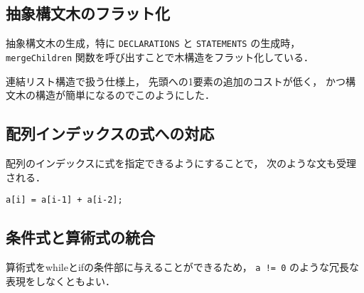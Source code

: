 \documentclass[lualatex, a4paper, ja=standard]{bxjsarticle}
\begin{document}
\subsection{抽象構文木のフラット化}

抽象構文木の生成，特に \verb|DECLARATIONS| と \verb|STATEMENTS| の生成時，
\verb|mergeChildren| 関数を呼び出すことで木構造をフラット化している．

連結リスト構造で扱う仕様上，
先頭への1要素の追加のコストが低く，
かつ構文木の構造が簡単になるのでこのようにした．

\subsection{配列インデックスの式への対応}

配列のインデックスに式を指定できるようにすることで，
次のような文も受理される．
\begin{Verbatim}[frame=lines]
a[i] = a[i-1] + a[i-2];
\end{Verbatim}

\subsection{条件式と算術式の統合}

算術式をwhileとifの条件部に与えることができるため，
\verb|a != 0| のような冗長な表現をしなくともよい．
\end{document}
